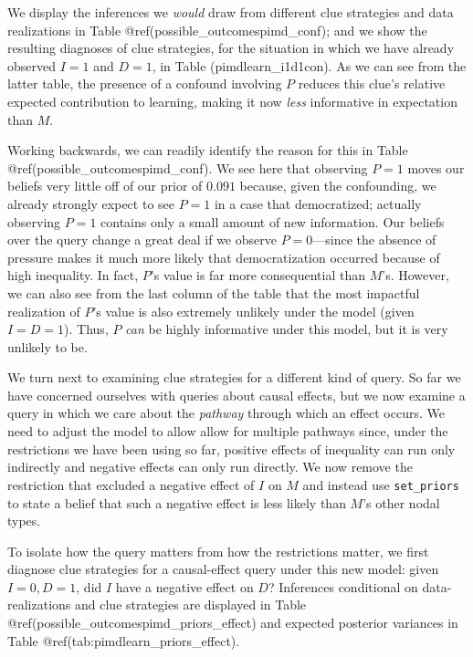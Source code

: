 \documentclass[
  12pt,
]{book}
\begin{document}
We display the inferences we \emph{would} draw from different clue strategies and data realizations in Table @ref(possible\_outcomespimd\_conf); and we show the resulting diagnoses of clue strategies, for the situation in which we have already observed \(I=1\) and \(D=1\), in Table (pimdlearn\_i1d1con). As we can see from the latter table, the presence of a confound involving \(P\) reduces this clue's relative expected contribution to learning, making it now \emph{less} informative in expectation than \(M\).

Working backwards, we can readily identify the reason for this in Table @ref(possible\_outcomespimd\_conf). We see here that observing \(P=1\) moves our beliefs very little off of our prior of \(0.091\) because, given the confounding, we already strongly expect to see \(P=1\) in a case that democratized; actually observing \(P=1\) contains only a small amount of new information. Our beliefs over the query change a great deal if we observe \(P=0\)---since the absence of pressure makes it much more likely that democratization occurred because of high inequality. In fact, \(P\)'s value is far more consequential than \(M\)'s. However, we can also see from the last column of the table that the most impactful realization of \(P\)'s value is also extremely unlikely under the model (given \(I=D=1\)). Thus, \(P\) \emph{can} be highly informative under this model, but it is very unlikely to be.

We turn next to examining clue strategies for a different kind of query. So far we have concerned ourselves with queries about causal effects, but we now examine a query in which we care about the \emph{pathway} through which an effect occurs. We need to adjust the model to allow allow for multiple pathways since, under the restrictions we have been using so far, positive effects of inequality can run only indirectly and negative effects can only run directly. We now remove the restriction that excluded a negative effect of \(I\) on \(M\) and instead use \texttt{set\_priors} to state a belief that such a negative effect is less likely than \(M\)'s other nodal types.

To isolate how the query matters from how the restrictions matter, we first diagnose clue strategies for a causal-effect query under this new model: given \(I=0, D=1\), did \(I\) have a negative effect on \(D\)? Inferences conditional on data-realizations and clue strategies are displayed in Table @ref(possible\_outcomespimd\_priors\_effect) and expected posterior variances in Table @ref(tab:pimdlearn\_priors\_effect).
\end{document}
